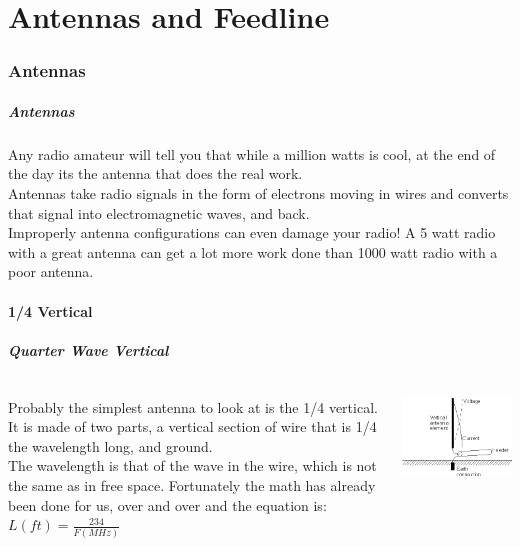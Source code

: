 \documentclass[10pt, handout]{beamer}
\begin{document}
\part{Antennas and Feedline}

\section{Antennas}

\begin{frame}
\frametitle{Antennas}
Any radio amateur will tell you that while a million watts is cool, at the end of the day its the antenna that does the real work.\\
Antennas take radio signals in the form of electrons moving in wires and converts that signal into electromagnetic waves, and back.\\
Improperly antenna configurations can even damage your radio! A 5 watt radio with a great antenna can get a lot more work done than 1000 watt radio with a poor antenna.
\end{frame}

\subsection{1/4 Vertical}

\begin{frame}
\frametitle{Quarter Wave Vertical}
\begin{columns}
\begin{column}{.6\textwidth}
Probably the simplest antenna to look at is the 1/4 vertical. It is made of two parts, a vertical section of wire that is 1/4 the wavelength long, and ground.\\
The wavelength is that of the wave in the wire, which is not the same as in free space. Fortunately the math has already been done for us, over and over and the equation is: $L\left(ft\right) = \frac{234}{F \left(MHz\right)}$
\end{column}
\begin{column}{.4\textwidth}
\includegraphics[width=\textwidth]{qwavevert.png}
\end{column}
\end{columns}
\end{frame}
\end{document}
